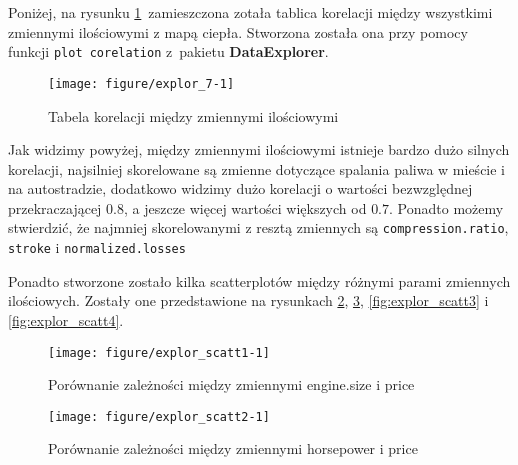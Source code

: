 \documentclass[12pt, a4paper]{article}\usepackage[]{graphicx}\usepackage[]{xcolor}
\makeatletter
\def\maxwidth{ %
  \ifdim\Gin@nat@width>\linewidth
    \linewidth
  \else
    \Gin@nat@width
  \fi
}
\newenvironment{knitrout}{}{} %
\makeatother
\begin{document}
Poniżej, na rysunku \ref{fig:explor_7}\ zamieszczona zotała tablica korelacji między wszystkimi zmiennymi ilościowymi z mapą ciepła. Stworzona została ona przy pomocy funkcji \texttt{plot corelation} z~pakietu \textbf{DataExplorer}.
\begin{knitrout}
\color{fgcolor}\begin{figure}[H]

{\centering \texttt{[image: figure/explor\_7-1]} 

}

\caption[Tabela korelacji między zmiennymi ilościowymi]{Tabela korelacji między zmiennymi ilościowymi}\label{fig:explor_7}
\end{figure}

\end{knitrout}

Jak widzimy powyżej, między zmiennymi ilościowymi istnieje bardzo dużo silnych korelacji, najsilniej skorelowane są zmienne dotyczące spalania paliwa w mieście i na autostradzie, dodatkowo widzimy dużo korelacji o wartości bezwzględnej przekraczającej $0.8$, a jeszcze więcej wartości większych od $0.7$. Ponadto możemy stwierdzić, że najmniej skorelowanymi z resztą zmiennych są \texttt{compression.ratio}, \texttt{stroke} i \texttt{normalized.losses} 

Ponadto stworzone zostało kilka scatterplotów między różnymi parami zmiennych ilościowych. Zostały one przedstawione na rysunkach \ref{fig:explor_scatt1}, \ref{fig:explor_scatt2}, \ref{fig:explor_scatt3} i \ref{fig:explor_scatt4}.
%
\begin{knitrout}
\color{fgcolor}\begin{figure}[H]

{\centering \texttt{[image: figure/explor\_scatt1-1]} 

}

\caption[Porównanie zależności między zmiennymi engine.size i price]{Porównanie zależności między zmiennymi engine.size i price}\label{fig:explor_scatt1}
\end{figure}

\end{knitrout}

\begin{knitrout}
\color{fgcolor}\begin{figure}[H]

{\centering \texttt{[image: figure/explor\_scatt2-1]} 

}

\caption[Porównanie zależności między zmiennymi horsepower i price]{Porównanie zależności między zmiennymi horsepower i price}\label{fig:explor_scatt2}
\end{figure}

\end{knitrout}
\end{document}
